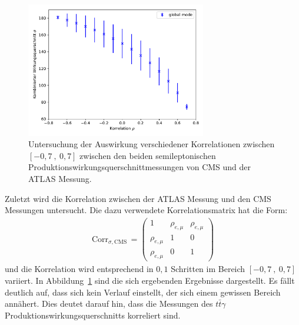 \begin{figure}
  \centering
  \includegraphics[width=0.7\textwidth]{Plots/corr_CA.pdf}
  \caption{Untersuchung der Auswirkung verschiedener Korrelationen zwischen $[-0,7~,~0,7]$ zwischen den beiden semileptonischen Produktionswirkungsquerschnittmessungen von CMS und der ATLAS Messung.}
  \label{fig:corrCA}
\end{figure}
Zuletzt wird die Korrelation zwischen der ATLAS Messung und den CMS Messungen untersucht. Die dazu verwendete Korrelationsmatrix hat die Form:
\begin{align}
  \text{Corr}_{\sigma,\text{CMS}}\,=\begin{pmatrix}
  1 & \rho_{e, \mu} & \rho_{e, \mu}\\
  \rho_{e, \mu} & 1 &0\\
  \rho_{e, \mu} & 0 & 1
  \end{pmatrix}
  \label{eqn:matrix2}
\end{align}
und die Korrelation wird entsprechend in $0,1$ Schritten im Bereich $[-0,7~,~0,7]$ variiert. In Abbildung~\ref{fig:corrCA} sind die sich ergebenden Ergebnisse dargestellt. Es fällt deutlich auf, dass sich kein Verlauf einstellt, der sich einem gewissen Bereich annähert. Dies deutet darauf hin, dass die Messungen des $t\bar{t}\gamma$ Produktionswirkungsquerschnitts korreliert sind.


